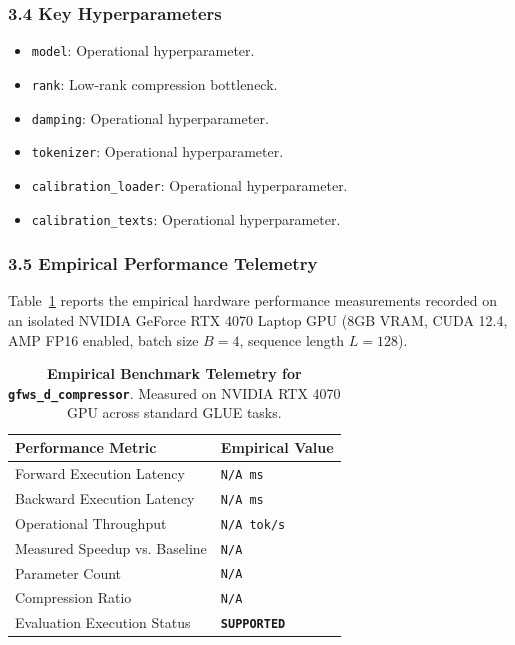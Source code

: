 \subsubsection*{3.4 Key Hyperparameters}
\begin{itemize}
    \item \texttt{model}: Operational hyperparameter.
    \item \texttt{rank}: Low-rank compression bottleneck.
    \item \texttt{damping}: Operational hyperparameter.
    \item \texttt{tokenizer}: Operational hyperparameter.
    \item \texttt{calibration\_loader}: Operational hyperparameter.
    \item \texttt{calibration\_texts}: Operational hyperparameter.
\end{itemize}

\subsubsection*{3.5 Empirical Performance Telemetry}
Table~\ref{tab:telemetry_gfws_d_compressor} reports the empirical hardware performance measurements recorded on an isolated NVIDIA GeForce RTX 4070 Laptop GPU (8GB VRAM, CUDA 12.4, AMP FP16 enabled, batch size $B=4$, sequence length $L=128$).

\begin{table}[h]
\centering
\small
\caption{\textbf{Empirical Benchmark Telemetry for \texttt{gfws\_d\_compressor}}. Measured on NVIDIA RTX 4070 GPU across standard GLUE tasks.}
\label{tab:telemetry_gfws_d_compressor}
\begin{tabularx}{\columnwidth}{lX}
\toprule
\textbf{Performance Metric} & \textbf{Empirical Value} \\
\midrule
Forward Execution Latency & \texttt{N/A ms} \\
Backward Execution Latency & \texttt{N/A ms} \\
Operational Throughput & \texttt{N/A tok/s} \\
Measured Speedup vs. Baseline & \texttt{N/A} \\
Parameter Count & \texttt{N/A} \\
Compression Ratio & \texttt{N/A} \\
Evaluation Execution Status & \textbf{\texttt{SUPPORTED}} \\
\bottomrule
\end{tabularx}
\end{table}

